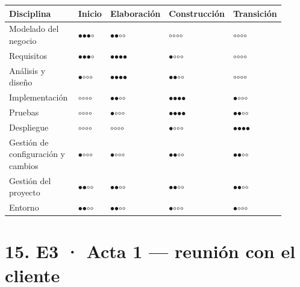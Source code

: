 \documentclass[11pt,a4paper]{article}
\begin{document}
{\footnotesize\setlength{\tabcolsep}{4pt}
\begin{longtable}{@{}>{\raggedright\arraybackslash}p{0.389\linewidth}>{\raggedright\arraybackslash}p{0.079\linewidth}>{\raggedright\arraybackslash}p{0.147\linewidth}>{\raggedright\arraybackslash}p{0.166\linewidth}>{\raggedright\arraybackslash}p{0.133\linewidth}@{}}
\toprule
\textbf{Disciplina} & \textbf{Inicio} & \textbf{Elaboración} & \textbf{Construcción} & \textbf{Transición} \\
\midrule
\endhead
Modelado del negocio & $\bullet$$\bullet$$\bullet$$\circ$ & $\bullet$$\bullet$$\circ$$\circ$ & $\circ$$\circ$$\circ$$\circ$ & $\circ$$\circ$$\circ$$\circ$ \\
Requisitos & $\bullet$$\bullet$$\bullet$$\circ$ & $\bullet$$\bullet$$\bullet$$\bullet$ & $\bullet$$\circ$$\circ$$\circ$ & $\circ$$\circ$$\circ$$\circ$ \\
Análisis y diseño & $\bullet$$\circ$$\circ$$\circ$ & $\bullet$$\bullet$$\bullet$$\bullet$ & $\bullet$$\bullet$$\circ$$\circ$ & $\circ$$\circ$$\circ$$\circ$ \\
Implementación & $\circ$$\circ$$\circ$$\circ$ & $\bullet$$\bullet$$\circ$$\circ$ & $\bullet$$\bullet$$\bullet$$\bullet$ & $\bullet$$\circ$$\circ$$\circ$ \\
Pruebas & $\circ$$\circ$$\circ$$\circ$ & $\bullet$$\circ$$\circ$$\circ$ & $\bullet$$\bullet$$\bullet$$\bullet$ & $\bullet$$\bullet$$\circ$$\circ$ \\
Despliegue & $\circ$$\circ$$\circ$$\circ$ & $\circ$$\circ$$\circ$$\circ$ & $\bullet$$\circ$$\circ$$\circ$ & $\bullet$$\bullet$$\bullet$$\bullet$ \\
Gestión de configuración y cambios & $\bullet$$\circ$$\circ$$\circ$ & $\bullet$$\circ$$\circ$$\circ$ & $\bullet$$\bullet$$\circ$$\circ$ & $\bullet$$\bullet$$\circ$$\circ$ \\
Gestión del proyecto & $\bullet$$\bullet$$\circ$$\circ$ & $\bullet$$\bullet$$\circ$$\circ$ & $\bullet$$\bullet$$\circ$$\circ$ & $\bullet$$\bullet$$\circ$$\circ$ \\
Entorno & $\bullet$$\bullet$$\circ$$\circ$ & $\bullet$$\bullet$$\circ$$\circ$ & $\bullet$$\circ$$\circ$$\circ$ & $\bullet$$\circ$$\circ$$\circ$ \\
\bottomrule
\end{longtable}}

\section*{15. E3 · Acta 1 — reunión con el cliente}
\end{document}
